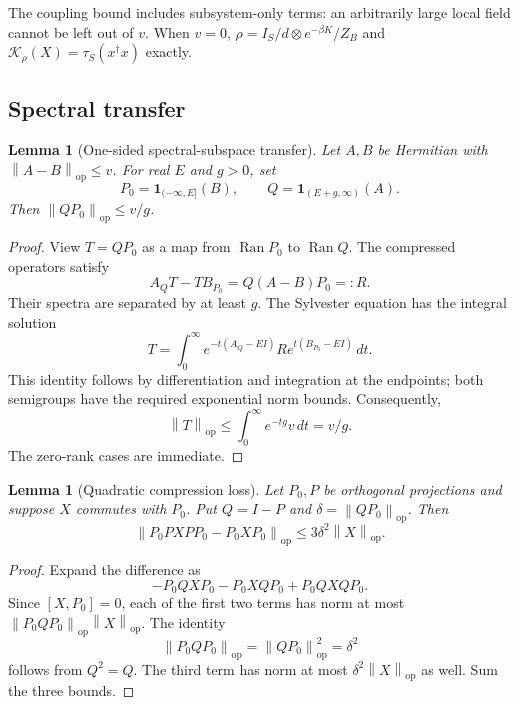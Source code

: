 \documentclass[11pt]{article}
\newtheorem{lemma}[theorem]{Lemma}
\theoremstyle{remark}\newtheorem{remark}[theorem]{Remark}
\newcommand{\op}{\mathrm{op}}
\newcommand{\id}{\mathbf 1}
\newcommand{\norm}[1]{\left\lVert #1\right\rVert}
\newcommand{\tauS}{\tau_S}
\begin{document}
The coupling bound includes subsystem-only terms: an arbitrarily large local field cannot be left out of $v$. When $v=0$, $\rho=I_S/d\otimes e^{-\beta K}/Z_B$ and $\mathcal K_\rho(X)=\tauS(x^\dagger x)$ exactly.

\subsection{Spectral transfer}
\begin{lemma}[One-sided spectral-subspace transfer]\label{lem:transfer}
Let $A,B$ be Hermitian with $\norm{A-B}_\op\leq v$. For real $E$ and $g>0$, set
\[
 P_0=\id_{(-\infty,E]}(B),\qquad Q=\id_{(E+g,\infty)}(A).
\]
Then $\norm{QP_0}_\op\leq v/g$.
\end{lemma}
\begin{proof}
View $T=QP_0$ as a map from $\operatorname{Ran}P_0$ to $\operatorname{Ran}Q$. The compressed operators satisfy
\[
 A_QT-TB_{P_0}=Q(A-B)P_0=:R.
\]
Their spectra are separated by at least $g$. The Sylvester equation has the integral solution
\[
 T=\int_0^\infty e^{-t(A_Q-EI)}R e^{t(B_{P_0}-EI)}\,dt.
\]
This identity follows by differentiation and integration at the endpoints; both semigroups have the required exponential norm bounds. Consequently,
\[
 \norm T_\op\leq\int_0^\infty e^{-tg}v\,dt=v/g.
\]
The zero-rank cases are immediate.
\end{proof}

\begin{lemma}[Quadratic compression loss]\label{lem:compression}
Let $P_0,P$ be orthogonal projections and suppose $X$ commutes with $P_0$. Put $Q=I-P$ and $\delta=\norm{QP_0}_\op$. Then
\begin{equation}\label{eq:compression}
 \norm{P_0PXP P_0-P_0XP_0}_\op\leq3\delta^2\norm X_\op.
\end{equation}
\end{lemma}
\begin{proof}
Expand the difference as
\[
 -P_0QXP_0-P_0XQP_0+P_0QXQP_0.
\]
Since $[X,P_0]=0$, each of the first two terms has norm at most $\norm{P_0QP_0}_\op\norm X_\op$. The identity
\[
 \norm{P_0QP_0}_\op=\norm{QP_0}_\op^2=\delta^2
\]
follows from $Q^2=Q$. The third term has norm at most $\delta^2\norm X_\op$ as well. Sum the three bounds.
\end{proof}
\end{document}
